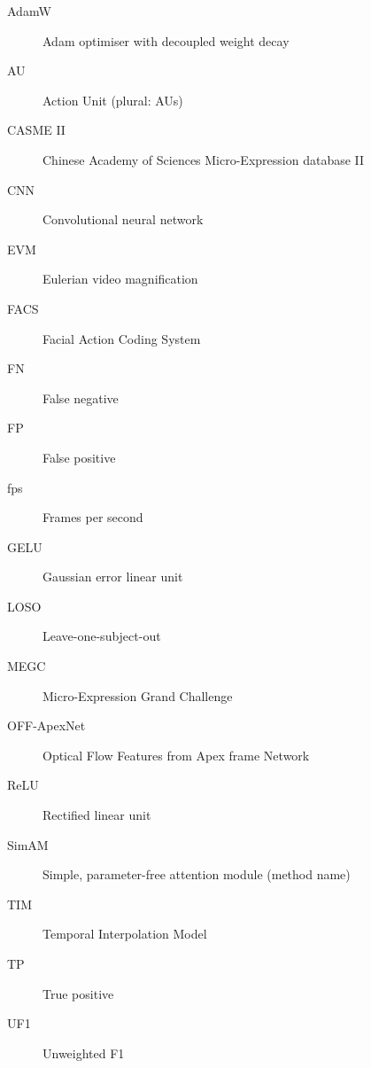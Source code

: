 \begin{description}
    \item[AdamW] Adam optimiser with decoupled weight decay
    \item[AU] Action Unit (plural: AUs)
    \item[CASME II] Chinese Academy of Sciences Micro-Expression database II
    \item[CNN] Convolutional neural network
    \item[EVM] Eulerian video magnification
    \item[FACS] Facial Action Coding System
    \item[FN] False negative
    \item[FP] False positive
    \item[fps] Frames per second
    \item[GELU] Gaussian error linear unit
    \item[LOSO] Leave-one-subject-out
    \item[MEGC] Micro-Expression Grand Challenge
    \item[OFF-ApexNet] Optical Flow Features from Apex frame Network
    \item[ReLU] Rectified linear unit
    \item[SimAM] Simple, parameter-free attention module (method name)
    \item[TIM] Temporal Interpolation Model
    \item[TP] True positive
    \item[UF1] Unweighted F1
\end{description}
